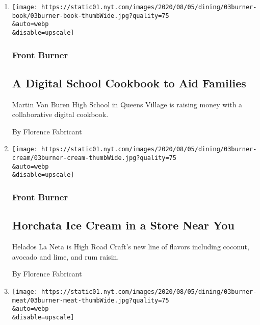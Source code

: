 \begin{enumerate}
\def\labelenumi{\arabic{enumi}.}
\item
  \href{/2020/08/03/dining/martin-van-buren-high-school-cookbook.html}{}

  \texttt{[image: https://static01.nyt.com/images/2020/08/05/dining/03burner-book/03burner-book-thumbWide.jpg?quality=75\\\&auto=webp\\\&disable=upscale]}

  \hypertarget{front-burner-1}{%
  \subsubsection{Front Burner}\label{front-burner-1}}

  \hypertarget{a-digital-school-cookbook-to-aid-families}{%
  \subsection{A Digital School Cookbook to Aid
  Families}\label{a-digital-school-cookbook-to-aid-families}}

  Martin Van Buren High School in Queens Village is raising money with a
  collaborative digital cookbook.

  By Florence Fabricant
\item
  \href{/2020/08/03/dining/mexican-ice-cream.html}{}

  \texttt{[image: https://static01.nyt.com/images/2020/08/05/dining/03burner-cream/03burner-cream-thumbWide.jpg?quality=75\\\&auto=webp\\\&disable=upscale]}

  \hypertarget{front-burner-2}{%
  \subsubsection{Front Burner}\label{front-burner-2}}

  \hypertarget{horchata-ice-cream-in-a-store-near-you}{%
  \subsection{Horchata Ice Cream in a Store Near
  You}\label{horchata-ice-cream-in-a-store-near-you}}

  Helados La Neta is High Road Craft's new line of flavors including
  coconut, avocado and lime, and rum raisin.

  By Florence Fabricant
\item
  \href{/2020/08/03/dining/new-york-biltong.html}{}

  \texttt{[image: https://static01.nyt.com/images/2020/08/05/dining/03burner-meat/03burner-meat-thumbWide.jpg?quality=75\\\&auto=webp\\\&disable=upscale]}


\end{enumerate}
